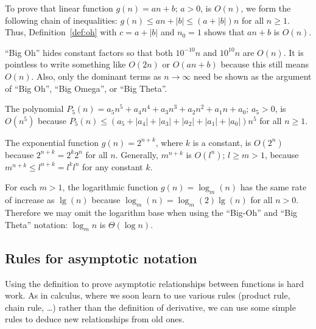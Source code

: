 \begin{Example}
To prove that 
linear function $g(n) = an + b$; $a > 0$, is $O(n)$, we
form the following chain of inequalities:  
\(g(n) \le an + |b| \le (a+|b|)n\) for all \(n \ge 1\).
Thus, Definition~\ref{def:oh}
with \(c=a+|b|\) and \(n_0 = 1\) shows 
that \(an + b\) is \(O(n)\). 
\end{Example} 
 
``Big Oh'' hides constant factors so that both $10^{-10}n$ and
$10^{10}n$ are $O(n)$. It is pointless to write something like  $O(2 
n)$ or $O(a  n + b)$ because this still means $O(n)$. Also, only 
the dominant terms as  $n \rightarrow
\infty$ need be shown as the argument of ``Big Oh'', ``Big Omega'', or
``Big Theta''.

\begin{Example} 
    The polynomial $P_{5}(n) = a_{5}n^{5} + a_{4}n^{4}+a_{3}n^{3} 
+a_{2}n^{2}+a_{1}n +a_{0}$; $a_{5}>0$, is $O(n^{5})$ 
because  
\(P_{5}(n) \leq (a_{5}+|a_{4}|+|a_{3}|+|a_{2}|+|a_{1}|+|a_{0}|)n^{5}\)
for  all \(n \ge 1\). 
\end{Example}


\begin{Example} 
\label{ex:expons}
The exponential function $g(n) = 2^{n+k}$, where $k$ is a constant,
is $O(2^{n})$ because 
\(2^{n+k} = 2^{k}  2^{n}\) for all \(n\).
Generally, $m^{n+k}$ is $O(l^{n})$; $l \ge m > 1$, because 
$m^{n+k} \le l^{n+k} = l^{k}  l^{n}$ for any constant $k$. 
\end{Example}

\begin{Example} 
\label{ex:logs}
For each $m>1$, the logarithmic function $g(n) = \log_{m}(n)$ has the same rate of 
increase as $\lg(n)$ because 
\(\log_{m}(n) = \log_{m}(2)  \lg(n)\) for  all \(n > 0\).
Therefore we may omit the logarithm base when using 
the ``Big-Oh'' and ``Big Theta'' notation: \(\log_{m}n\) is \(\Theta(\log n)\).
\end{Example}


\subsection{Rules for asymptotic notation}
\label{o-features}
 
Using the definition to prove asymptotic relationships between functions is hard
work. As in calculus, where we soon learn to use various rules (product rule, 
chain rule, \dots) rather than the definition of derivative, we can use some 
simple rules to deduce new relationships from old ones.

